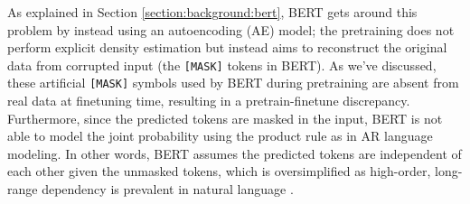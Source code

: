 {{As explained in Section \ref{section:background:bert}, BERT gets around this problem by instead using an autoencoding (AE) model; the pretraining does not perform explicit density estimation but instead aims to reconstruct the original data from corrupted input (the \texttt{[MASK]} tokens in BERT). As we've discussed, these artificial \texttt{[MASK]} symbols used by BERT during pretraining are absent from real data at finetuning time, resulting in a pretrain-finetune discrepancy. Furthermore, since the predicted tokens are masked in the input, BERT is not able to model the joint probability using the product rule as in AR language modeling. In other words, BERT assumes the predicted tokens are independent of each other given the unmasked tokens, which is oversimplified as high-order, long-range dependency is prevalent in natural language \cite{Dai2019}.

}}
